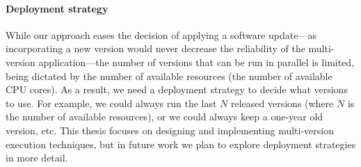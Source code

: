 \paragraph{Deployment strategy} While our approach eases the decision of
applying a software update---as incorporating a new version would never
decrease the reliability of the multi-version application---the
number of versions that can be run in parallel is limited, being dictated by
the number of available resources (\eg the number of available CPU cores).  As
a result, we need a deployment strategy to decide what versions to use.  For
example, we could always run the last $N$ released versions (where $N$ is the
number of available resources), or we could always keep a one-year old version,
etc.  This thesis focuses on designing and implementing multi-version execution
techniques, but in future work we plan to explore deployment strategies in more
detail.
